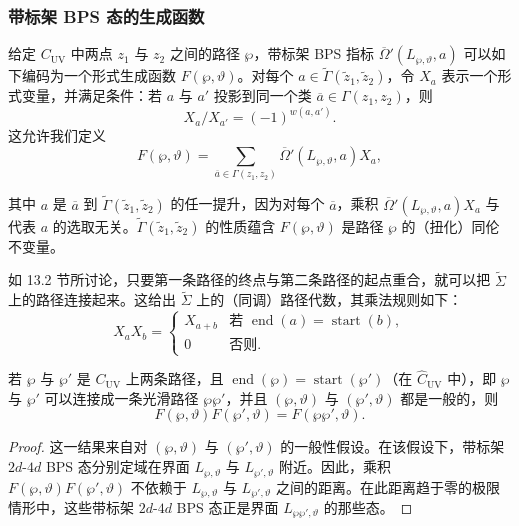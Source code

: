 \subsubsection*{带标架 BPS 态的生成函数}
给定 $C_{\mathrm{UV}}$ 中两点 $z_1$ 与 $z_2$ 之间的路径 $\wp$，带标架 BPS 指标 $\overline{\Omega}{}'(L_{\wp,\vartheta},a)$ 可以如下编码为一个形式生成函数 $F(\wp,\vartheta)$。对每个 $a\in\widetilde{\Gamma}(\widetilde{z}_1,\widetilde{z}_2)$，令 $X_a$ 表示一个形式变量，并满足条件：若 $a$ 与 $a'$ 投影到同一个类 $\overline{a}\in\Gamma(z_1,z_2)$，则
\[
X_a/X_{a'}=(-1)^{w(a,a')}.
\]
这允许我们定义
\begin{equation}
F(\wp,\vartheta)=\sum_{\overline{a}\in\Gamma(z_1,z_2)}\overline{\Omega}{}'(L_{\wp,\vartheta},a)X_a,\tag{22.13}
\end{equation}

其中 $a$ 是 $\overline{a}$ 到 $\widetilde{\Gamma}(\widetilde{z}_1,\widetilde{z}_2)$ 的任一提升，因为对每个 $\overline{a}$，乘积 $\overline{\Omega}{}'(L_{\wp,\vartheta},a)X_a$ 与代表 $a$ 的选取无关。$\widetilde{\Gamma}(\widetilde{z}_1,\widetilde{z}_2)$ 的性质蕴含 $F(\wp,\vartheta)$ 是路径 $\wp$ 的（扭化）同伦不变量。

如 13.2 节所讨论，只要第一条路径的终点与第二条路径的起点重合，就可以把 $\widetilde{\Sigma}$ 上的路径连接起来。这给出 $\widetilde{\Sigma}$ 上的（同调）路径代数，其乘法规则如下：
\[
X_aX_b=\begin{cases}
X_{a+b} & \text{若 } \operatorname{end}(a)=\operatorname{start}(b),\\
0 & \text{否则}.
\end{cases}
\]

\begin{proposition}[22.21]
若 $\wp$ 与 $\wp'$ 是 $C_{\mathrm{UV}}$ 上两条路径，且 $\operatorname{end}(\wp)=\operatorname{start}(\wp')$（在 $\widehat{C}_{\mathrm{UV}}$ 中），即 $\wp$ 与 $\wp'$ 可以连接成一条光滑路径 $\wp\wp'$，并且 $(\wp,\vartheta)$ 与 $(\wp',\vartheta)$ 都是一般的，则
\[
F(\wp,\vartheta)F(\wp',\vartheta)=F(\wp\wp',\vartheta).
\]
\end{proposition}

\begin{proof}
这一结果来自对 $(\wp,\vartheta)$ 与 $(\wp',\vartheta)$ 的一般性假设。在该假设下，带标架 $2d$-$4d$ BPS 态分别定域在界面 $L_{\wp,\vartheta}$ 与 $L_{\wp',\vartheta}$ 附近。因此，乘积 $F(\wp,\vartheta)F(\wp',\vartheta)$ 不依赖于 $L_{\wp,\vartheta}$ 与 $L_{\wp',\vartheta}$ 之间的距离。在此距离趋于零的极限情形中，这些带标架 $2d$-$4d$ BPS 态正是界面 $L_{\wp\wp',\vartheta}$ 的那些态。
\end{proof}

